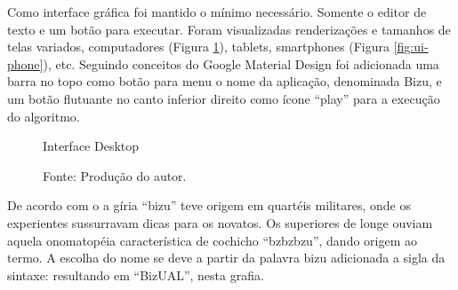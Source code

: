 Como interface gráfica foi mantido o mínimo necessário. Somente o editor de texto e um botão para executar. Foram visualizadas renderizações e tamanhos de telas variados, computadores (Figura \ref{fig:ui-pc}), tablets, smartphones (Figura \ref{fig:ui-phone}), etc. Seguindo conceitos do Google Material Design foi adicionada uma barra no topo como botão para menu o nome da aplicação, denominada Bizu, e um botão flutuante no canto inferior direito como ícone ``play'' para a execução do algoritmo.

\begin{figure}[h]
  \caption{Interface Desktop}\label{fig:ui-pc}
  \centering
  \setlength{\fboxsep}{0pt}%
\setlength{\fboxrule}{1pt}%
  \caption*{\footnotesize Fonte: Produção do autor.}
\end{figure}

De acordo com o  a gíria ``bizu'' teve origem em quartéis militares, onde os experientes sussurravam dicas para os novatos. Os superiores de longe ouviam aquela onomatopéia característica de cochicho ``bzbzbzu'', dando origem ao termo. A escolha do nome se deve a partir da palavra bizu adicionada a sigla da sintaxe: resultando em ``BizUAL'', nesta grafia.


